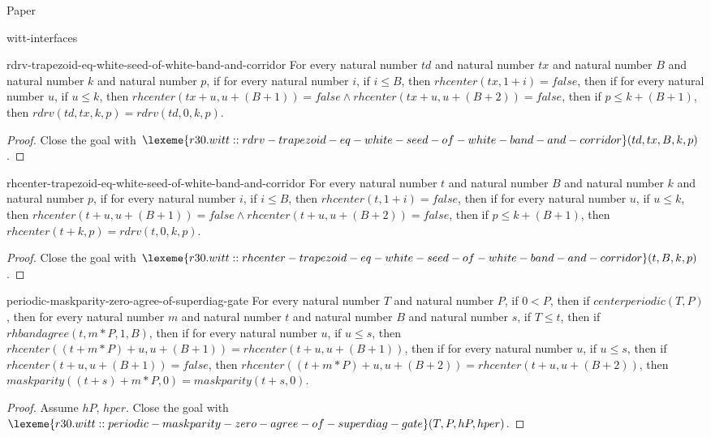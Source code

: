 \begin{lexlean}{Paper}
\begin{section}{witt-interfaces}
  \begin{theorem}{rdrv-trapezoid-eq-white-seed-of-white-band-and-corridor}
  For every natural number \(td\) and natural number \(tx\) and natural number \(B\) and natural number \(k\) and natural number \(p\), if for every natural number \(i\), if \(i ≤ B\), then \(rhcenter(tx, 1 + i) = false\), then if for every natural number \(u\), if \(u ≤ k\), then \(rhcenter(tx + u, u + (B + 1)) = false ∧ rhcenter(tx + u, u + (B + 2)) = false\), then if \(p ≤ k + (B + 1)\), then \(rdrv(td, tx, k, p) = rdrv(td, 0, k, p)\).
  \begin{proof}
  Close the goal with \(\lexeme{r30.witt::rdrv-trapezoid-eq-white-seed-of-white-band-and-corridor}(td, tx, B, k, p)\).
  \end{proof}
  \end{theorem}

  \begin{theorem}{rhcenter-trapezoid-eq-white-seed-of-white-band-and-corridor}
  For every natural number \(t\) and natural number \(B\) and natural number \(k\) and natural number \(p\), if for every natural number \(i\), if \(i ≤ B\), then \(rhcenter(t, 1 + i) = false\), then if for every natural number \(u\), if \(u ≤ k\), then \(rhcenter(t + u, u + (B + 1)) = false ∧ rhcenter(t + u, u + (B + 2)) = false\), then if \(p ≤ k + (B + 1)\), then \(rhcenter(t + k, p) = rdrv(t, 0, k, p)\).
  \begin{proof}
  Close the goal with \(\lexeme{r30.witt::rhcenter-trapezoid-eq-white-seed-of-white-band-and-corridor}(t, B, k, p)\).
  \end{proof}
  \end{theorem}

  \begin{theorem}{periodic-maskparity-zero-agree-of-superdiag-gate}
  For every natural number \(T\) and natural number \(P\), if \(0 < P\), then if \(centerperiodic(T, P)\), then for every natural number \(m\) and natural number \(t\) and natural number \(B\) and natural number \(s\), if \(T ≤ t\), then if \(rhbandagree(t, m * P, 1, B)\), then if for every natural number \(u\), if \(u ≤ s\), then \(rhcenter((t + m * P) + u, u + (B + 1)) = rhcenter(t + u, u + (B + 1))\), then if for every natural number \(u\), if \(u ≤ s\), then if \(rhcenter(t + u, u + (B + 1)) = false\), then \(rhcenter((t + m * P) + u, u + (B + 2)) = rhcenter(t + u, u + (B + 2))\), then \(maskparity((t + s) + m * P, 0) = maskparity(t + s, 0)\).
  \begin{proof}
  Assume \(hP\), \(hper\).
  Close the goal with \(\lexeme{r30.witt::periodic-maskparity-zero-agree-of-superdiag-gate}(T, P, hP, hper)\).
  \end{proof}
  \end{theorem}


\end{section}
\end{lexlean}

